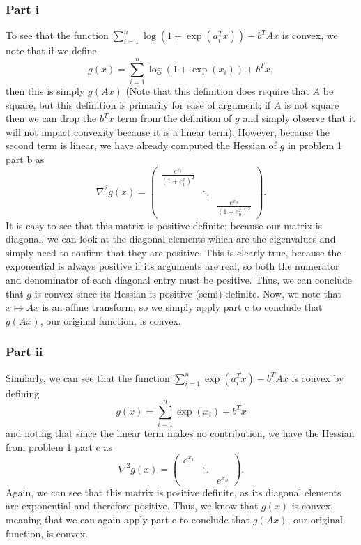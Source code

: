 \documentclass{article}
\begin{document}
\subsubsection{Part i}
To see that the function $\sum_{i=1}^n \log(1+\exp(a_i^Tx))- b^TAx$ is convex, we note that if we define 
\[
g(x)=\sum_{i=1}^n \log(1+\exp(x_i))+b^Tx,
\]
then this is simply $g(Ax)$ (Note that this definition does require that $A$ be square, but this definition is primarily for ease of argument; if $A$ is not square then we can drop the $b^Tx$ term from the definition of $g$ and simply observe that it will not impact convexity because it is a linear term). However, because the second term is linear, we have already computed the Hessian of $g$ in problem 1 part b as
\[
\nabla^2 g(x)=
\begin{pmatrix}
\frac{e^{x_1}}{(1+e^x_1)^2}\\
& \ddots\\
&& \frac{e^{x_n}}{(1+e^x_n)^2}
\end{pmatrix}.
\]
It is easy to see that this matrix is positive definite; because our matrix is diagonal, we can look at the diagonal elements which are the eigenvalues and simply need to confirm that they are positive. This is clearly true, because the exponential is always positive if its arguments are real, so both the numerator and denominator of each diagonal entry must be positive. Thus, we can conclude that $g$ is convex since its Hessian is positive (semi)-definite. Now, we note that $x\mapsto Ax$ is an affine transform, so we simply apply part c to conclude that $g(Ax)$, our original function, is convex.
\subsubsection{Part ii}
Similarly, we can see that the function $\sum_{i=1}^n \exp(a_i^Tx) - b^TAx$ is convex by defining 
\[
g(x)=\sum_{i=1}^n\exp(x_i)+b^Tx
\]
and noting that since the linear term makes no contribution, we have the Hessian from problem 1 part c as
\[
\nabla^2 g(x)=
\begin{pmatrix}
e^{x_1}\\
& \ddots\\
&& e^{x_n}
\end{pmatrix}.
\]
Again, we can see that this matrix is positive definite, as its diagonal elements are exponential and therefore positive. Thus, we know that $g(x)$ is convex, meaning that we can again apply part c to conclude that $g(Ax)$, our original function, is convex.
\end{document}
